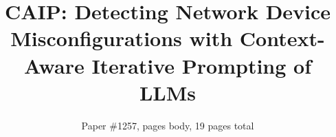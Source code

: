 \documentclass[sigconf]{acmart}
\begin{document}


	\title[CAIP]{CAIP: Detecting Network Device Misconfigurations with Context-Aware Iterative Prompting of LLMs}
		\author{Paper \#1257, \pageref{endOfBody} pages body, 19 pages total}
        
		\newcommand{\chase}[1]{\textcolor{blue}{[#1]}}
		\newcommand{\eg}{{\it e.g.}}
		\newcommand{\ie}{{\it i.e.}}
		\newcommand{\aaron}[1]{{\color{teal}{(Aaron: #1)}}}
		\newcommand{\mypara}[1]{\vspace{0.05cm}\noindent{\bf {#1}}}
		\newcommand{\mysubpara}[1]{\vspace{0.05cm}\noindent{\textit{#1}}}
		\newcommand{\etal}{{\it et al.}}
		\newcommand{\sysname}{{CAIP}}
		\newlength{\oldintextsep}
		\setlength{\oldintextsep}{\intextsep}
		\setlength\intextsep{0pt}

        		\maketitle







		\label{endOfBody}
		
		

		\normalfont %
	
	
\end{document}
